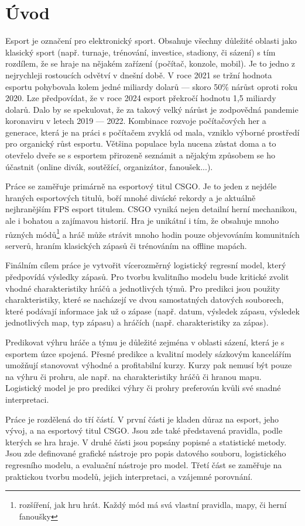 \chapter{Úvod}
Esport je označení pro elektronický sport. Obsahuje všechny důležité oblasti jako klasický sport (např. turnaje, trénování, investice, stadiony, či sázení)
s tím rozdílem, že se hraje na nějakém zařízení (počítač, konzole, mobil). Je to jedno z nejrychleji rostoucích odvětví v dnešní době. V roce 2021 se tržní hodnota
esportu pohybovala kolem jedné miliardy dolarů --- skoro 50\% nárůst oproti roku 2020. Lze předpovídat, že v roce 2024 esport překročí hodnotu 1,5 miliardy dolarů.
Dalo by se spekulovat, že za takový velký nárůst je zodpovědná pandemie koronaviru v letech 2019 --- 2022. Kombinace rozvoje počítačových her a generace, která je na
práci s počítačem zvyklá od mala, vzniklo výborné prostředí pro organický růst esportu. Většina populace byla nucena zůstat doma a to otevřelo dveře
se s esportem přirozeně seznámit a nějakým způsobem se ho účastnit (online divák, soutěžící, organizátor, fanoušek...). 

Práce se zaměřuje primárně na esportový titul \acf{CSGO}. Je to jeden z nejdéle hraných esportových titulů, boří mnohé divácké rekordy a je aktuálně nejhranějším
\ac{FPS} esport titulem. \ac{CSGO} vyniká nejen detailní herní mechanikou, ale i bohatou a zajímavou historií. Hra je unikátní i tím, že obsahuje mnoho různých
módů\footnote{rozšíření, jak hru hrát. Každý mód má svá vlastní pravidla, mapy, či herní fanoušky} a hráč může strávit mnoho hodin pouze objevováním komunitních
serverů, hraním klasických zápasů či trénováním na offline mapách.

Finálním cílem práce je vytvořit vícerozměrný logistický regresní model, který předpovídá výsledky zápasů. Pro tvorbu kvalitního modelu bude kritické zvolit vhodné
charakteristiky hráčů a jednotlivých týmů. Pro predikci jsou použity charakteristiky, které se nacházejí ve dvou samostatných datových
souborech, které podávají informace jak už o zápase (např. datum, výsledek zápasu, výsledek jednotlivých map, typ zápasu) a hráčích (např. charakteristiky za zápas). 

Predikovat výhru hráče a týmu je důležité zejména v oblasti sázení, která je s esportem úzce spojená. Přesné predikce a kvalitní modely sázkovým kancelářím umožňují
stanovovat výhodné a profitabilní kurzy. Kurzy pak nemusí být pouze na výhru či prohru, ale např. na charakteristiky hráčů či hranou mapu. Logistický model je 
pro predikci výhry či prohry preferován kvůli své snadné interpretaci.

Práce je rozdělená do tří částí. V první části je kladen důraz na esport, jeho vývoj, a na esportový titul \ac{CSGO}. Jsou zde také představená pravidla, podle kterých se
hra hraje. V druhé části jsou popsány popisné a statistické metody. Jsou zde definované grafické nástroje pro popis datového souboru, logistického
regresního modelu, a evaluační nástroje pro model. Třetí část se zaměřuje na praktickou tvorbu modelů, jejich interpretaci, a vzájemné porovnání.
